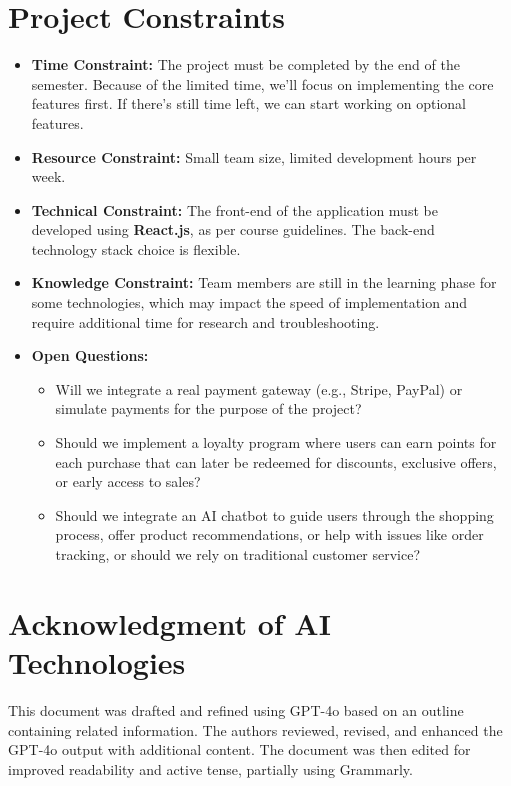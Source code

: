 \documentclass[a4paper,12pt]{article}
\begin{document}
\section{Project Constraints}
	\begin{itemize}
		\item \textbf{Time Constraint:}  The project must be completed by the end of the semester.
		Because of the limited time, we'll focus on implementing the core features first. If there's
		still time left, we can start working on optional features.
		\item \textbf{Resource Constraint:} Small team size, limited development hours per week.
		\item \textbf{Technical Constraint:} The front-end of the application must be \\ developed using
		\textbf{React.js}, as per course guidelines. The back-end \\ technology stack choice is flexible.
		\item \textbf{Knowledge Constraint:} Team members are still in the learning phase for some
		technologies, which may impact the speed of implementation and require additional time for
		research and troubleshooting.
		\item \textbf{Open Questions:}
		\begin{itemize}
			\item Will we integrate a real payment gateway (e.g., Stripe, PayPal) or simulate payments
			for the purpose of the project?
			\item Should we implement a loyalty program where users can earn points for each purchase
			that can later be redeemed for discounts, exclusive offers, or early access to sales?
			\item Should we integrate an AI chatbot to guide users through the shopping process, offer
			product recommendations, or help with issues like order tracking, or should we rely on
			traditional customer service?
		\end{itemize}
	\end{itemize}

\section{Acknowledgment of AI Technologies}
	This document was drafted and refined using GPT-4o based on an outline containing related information. The authors reviewed, revised, and enhanced the GPT-4o output with additional content. The document was then edited for improved readability and active tense, partially using Grammarly.
	
\end{document}
